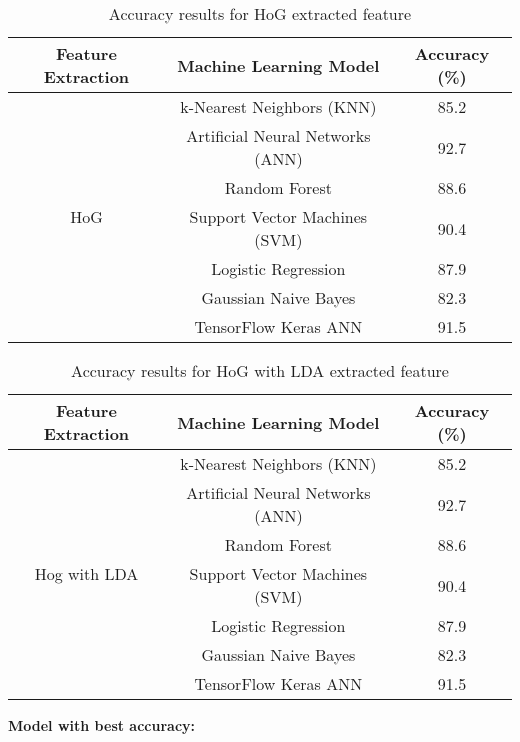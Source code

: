 \documentclass[a4paper]{article}
\theoremstyle{plain}
\theoremstyle{definition}
\begin{document}
\begin{table}[htbp]
\centering
\Large
\caption{Accuracy results for HoG extracted feature}
\label{tab:results}
\begin{tabular}{|c|c|c|}
\hline
\textbf{Feature Extraction} & \textbf{Machine Learning Model} & \textbf{Accuracy (\%)} \\ \hline
\multirow{7}{*}{HoG} & k-Nearest Neighbors (KNN) & 85.2 \\ \cline{2-3} 
 & Artificial Neural Networks (ANN) & 92.7 \\ \cline{2-3} 
 & Random Forest & 88.6 \\ \cline{2-3} 
 & Support Vector Machines (SVM) & 90.4 \\ \cline{2-3} 
 & Logistic Regression & 87.9 \\ \cline{2-3} 
 & Gaussian Naive Bayes & 82.3 \\ \cline{2-3} 
 & TensorFlow Keras ANN & 91.5 \\ \hline
\end{tabular}
\end{table}






\clearpage

\begin{table}[htbp]
\centering
\Large
\caption{Accuracy results for HoG with LDA extracted feature}
\label{tab:results}
\begin{tabular}{|c|c|c|}
\hline
\textbf{Feature Extraction} & \textbf{Machine Learning Model} & \textbf{Accuracy (\%)} \\ \hline
\multirow{7}{*}{Hog with LDA } & k-Nearest Neighbors (KNN) & 85.2 \\ \cline{2-3} 
 & Artificial Neural Networks (ANN) & 92.7 \\ \cline{2-3} 
 & Random Forest & 88.6 \\ \cline{2-3} 
 & Support Vector Machines (SVM) & 90.4 \\ \cline{2-3} 
 & Logistic Regression & 87.9 \\ \cline{2-3} 
 & Gaussian Naive Bayes & 82.3 \\ \cline{2-3} 
 & TensorFlow Keras ANN & 91.5 \\ \hline
\end{tabular}
\end{table}
\textbf{Model with best accuracy:}
\end{document}
